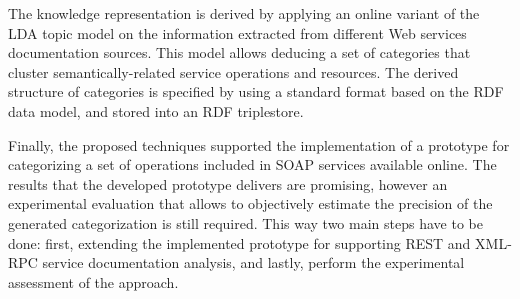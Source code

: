 The knowledge representation is derived by applying an online variant of the LDA topic model on the information extracted from different Web services documentation sources. This model allows deducing a set of categories that cluster semantically-related service operations and resources. The derived structure of categories is specified by using a standard format based on the RDF data model, and stored into an RDF triplestore.

Finally, the proposed techniques supported the implementation of a prototype for categorizing a set of operations included in SOAP services available online. The results that the developed prototype delivers are promising, however an experimental evaluation that allows to objectively estimate the precision of the generated categorization is still required. This way two main steps have to be done: first, extending the implemented prototype for supporting REST and XML-RPC service documentation analysis, and lastly, perform the experimental assessment of the approach.  